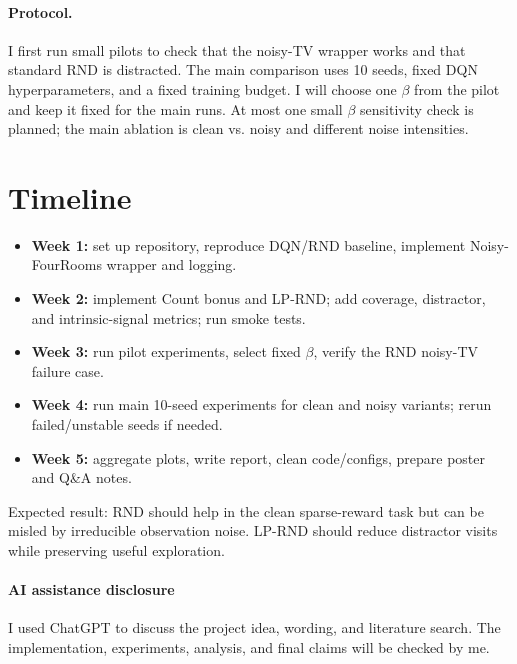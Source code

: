 \documentclass{article}
\begin{document}
\paragraph{Protocol.}
I first run small pilots to check that the noisy-TV wrapper works and that standard RND is distracted. The main comparison uses 10 seeds, fixed DQN hyperparameters, and a fixed training budget. I will choose one $\beta$ from the pilot and keep it fixed for the main runs. At most one small $\beta$ sensitivity check is planned; the main ablation is clean vs. noisy and different noise intensities.

\section{Timeline}
\begin{itemize}
    \item \textbf{Week 1:} set up repository, reproduce DQN/RND baseline, implement Noisy-FourRooms wrapper and logging.
    \item \textbf{Week 2:} implement Count bonus and LP-RND; add coverage, distractor, and intrinsic-signal metrics; run smoke tests.
    \item \textbf{Week 3:} run pilot experiments, select fixed $\beta$, verify the RND noisy-TV failure case.
    \item \textbf{Week 4:} run main 10-seed experiments for clean and noisy variants; rerun failed/unstable seeds if needed.
    \item \textbf{Week 5:} aggregate plots, write report, clean code/configs, prepare poster and Q\&A notes.
\end{itemize}

Expected result: RND should help in the clean sparse-reward task but can be misled by irreducible observation noise. LP-RND should reduce distractor visits while preserving useful exploration.

\paragraph{AI assistance disclosure}
I used ChatGPT to discuss the project idea, wording, and literature search. The implementation, experiments, analysis, and final claims will be checked by me.



\end{document}
